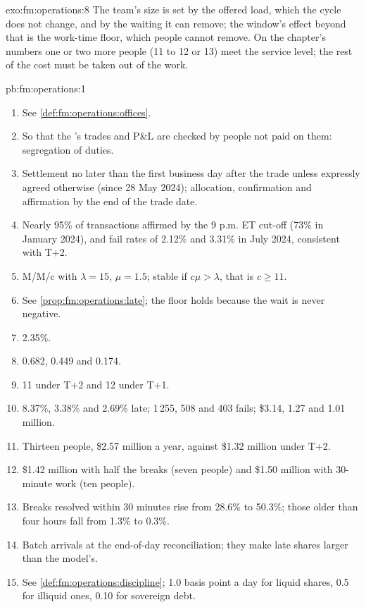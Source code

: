 \begin{solution}{exo:fm:operations:8}
The team's size is set by the offered load, which the cycle does not change, and by the waiting it can remove; the window's effect beyond that is
the work-time floor, which people cannot remove. On the chapter's numbers one or two more people (11 to 12 or 13) meet the service level; the rest of
the cost must be taken out of the work.
\end{solution}

\begin{solution}{pb:fm:operations:1}
\begin{enumerate}
\item See \cref{def:fm:operations:offices}.
\item So that the 's trades and P\&L are checked by people not paid on them: segregation of duties.
\item Settlement no later than the first business day after the trade unless expressly agreed otherwise (since 28 May 2024); allocation,
confirmation and affirmation by the end of the trade date.
\item Nearly 95\% of transactions affirmed by the 9 p.m. ET cut-off (73\% in January 2024), and fail rates of 2.12\% and 3.31\% in July 2024,
consistent with T+2.
\item M/M/c with $\lambda=15$, $\mu=1.5$; stable if $c\mu>\lambda$, that is $c\ge11$.
\item See \cref{prop:fm:operations:late}; the floor holds because the wait is never negative.
\item 2.35\%.
\item 0.682, 0.449 and 0.174.
\item 11 under T+2 and 12 under T+1.
\item 8.37\%, 3.38\% and 2.69\% late; 1\,255, 508 and 403 fails; \$3.14, 1.27 and 1.01 million.
\item Thirteen people, \$2.57 million a year, against \$1.32 million under T+2.
\item \$1.42 million with half the breaks (seven people) and \$1.50 million with 30-minute work (ten people).
\item Breaks resolved within 30 minutes rise from 28.6\% to 50.3\%; those older than four hours fall from 1.3\% to 0.3\%.
\item Batch arrivals at the end-of-day reconciliation; they make late shares larger than the model's.
\item See \cref{def:fm:operations:discipline}; 1.0 basis point a day for liquid shares, 0.5 for illiquid ones, 0.10 for sovereign debt.

\end{enumerate}
\end{solution}
